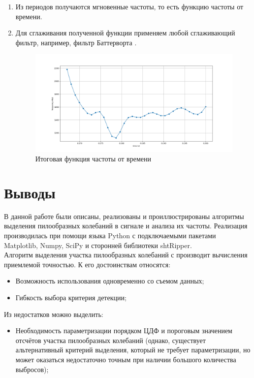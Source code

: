 \documentclass[12pt,a4paper]{article}
\begin{document}
\begin{enumerate}
			\item Из периодов получаются мгновенные частоты, то есть функцию частоты от времени.
			
			\item Для сглаживания полученной функции применяем любой сглаживающий фильтр, например,
			фильтр Баттерворта \cite{butter}.
			\FloatBarrier
			\begin{figure}[h!]
				\centering\includegraphics[width=1\linewidth]{./../plots/freq_plot.png}
				\caption{Итоговая функция частоты от времени}
			\end{figure}
			\FloatBarrier
			
			
		\end{enumerate}
	\newpage
	
	\section{Выводы}
	В данной работе были описаны, реализованы и проиллюстрированы алгоритмы выделения пилообразных колебаний в сигнале и анализа их частоты. Реализация производилась при помощи языка Python с подключаемыми пакетами Matplotlib, Numpy, SciPy и сторонней библиотеки shtRipper.\\
	
	Алгоритм выделения участка пилообразных колебаний с производит вычисления приемлемой точностью. К его достоинствам относятся:
	\begin{itemize}
		\item Возможность использования одновременно со съемом данных;
		\item Гибкость выбора критерия детекции;
	\end{itemize}
	Из недостатков можно выделить:
	 \begin{itemize}
		\item Необходимость параметризации порядком ЦДФ и пороговым значением отсчётов участка пилообразных колебаний (однако, существует альтернативный критерий выделения, который не требует параметризации, но может оказаться недостаточно точным при наличии большого количества выбросов);
	 \end{itemize}
 	
\end{document}
